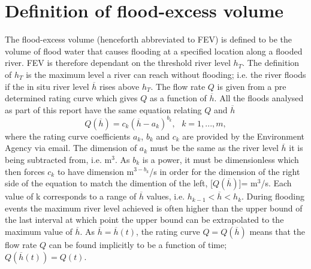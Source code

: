 \documentclass[11pt,a4paper]{article}
\begin{document}
\section{Definition of flood-excess volume}
The flood-excess volume (henceforth abbreviated to FEV) is defined to be the volume of flood water that causes flooding at a specified location along a flooded river. FEV is therefore dependant on the threshold river level $h_T$. The definition of $h_T$ is the maximum level a river can reach without flooding{;} i.e. the river floods if the in situ river level $\overline{h}$ rises above $h_T$. The flow rate $Q$ is given from a pre determined rating curve which gives $Q$ as a function of $\overline{h}$. All the floods analysed as part of this report have the same equation relating $Q$ and $\overline{h}$
\begin{equation}\tag{2.1}
Q(\overline{h})=c_k (\overline{h}-a_k )^{b_k},\text{ }k=1,...,m,
\end{equation}
where the rating curve coefficients $a_k$, $b_k$ and $c_k$ are provided by the Environment Agency via email. The dimension of $a_k$ must be the same as the river level $\overline{h}$ it is being subtracted from, i.e. m$^3$. As $b_k$ is a power, it must be dimensionless which then forces $c_k$ to have dimension m$^{3-b_k}$/s in order for the dimension of the right side of the equation to match the dimention of the left, [$Q(\overline{h})$]= m$^3$/s. Each value of k corresponds to a range of $\overline{h}$ values, i.e. $h_{k-1}<\overline{h}<h_k$. During flooding events the maximum river level achieved is often higher than the upper bound of the last interval at which point the upper bound can be extrapolated to the maximum value of $\overline{h}$. As $\overline{h}=\overline{h}(t)$, the rating curve $Q=Q(\overline{h})$ means that the flow rate $Q$ can be found implicitly to be a function of time{;} $Q(\overline{h}(t))=Q(t)$.
\end{document}
